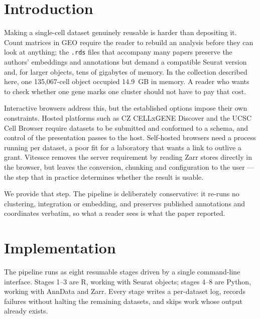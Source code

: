 %

\section{Introduction}

Making a single-cell dataset genuinely reusable is harder than depositing it.
Count matrices in GEO require the reader to rebuild an analysis before they can
look at anything; the \texttt{.rds} files that accompany many papers preserve
the authors' embeddings and annotations but demand a compatible Seurat version
\citep{hao2024seurat} and, for larger objects, tens of gigabytes of memory. In
the collection described here, one 135,067-cell object occupied 14.9~GB in
memory. A reader who wants to check whether one gene marks one cluster should
not have to pay that cost.

Interactive browsers address this, but the established options impose their own
constraints. Hosted platforms such as CZ CELLxGENE Discover
\citep{czi2025cellxgene} and the UCSC Cell Browser \citep{speir2021cellbrowser}
require datasets to be submitted and conformed to a schema, and control of the
presentation passes to the host. Self-hosted browsers need a process running per
dataset, a poor fit for a laboratory that wants a link to outlive a grant.
Vitessce \citep{keller2025vitessce} removes the server requirement by reading
Zarr stores \citep{moore2021ngff} directly in the browser, but leaves the
conversion, chunking and configuration to the user --- the step that in practice
determines whether the result is usable.

We provide that step. The pipeline is deliberately conservative: it re-runs no
clustering, integration or embedding, and preserves published annotations and
coordinates verbatim, so what a reader sees is what the paper reported.

\section{Implementation}

The pipeline runs as eight resumable stages driven by a single command-line
interface. Stages 1--3 are R, working with Seurat objects; stages 4--8 are
Python, working with AnnData \citep{virshup2024anndata} and Zarr. Every stage
writes a per-dataset log, records failures without halting the remaining
datasets, and skips work whose output already exists.

